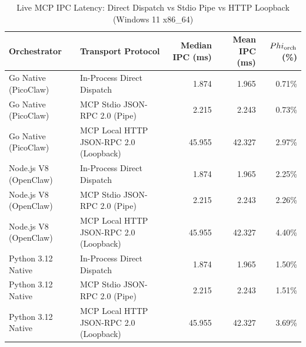 \begin{table}[t]
\centering\small
\caption{Live MCP IPC Latency: Direct Dispatch vs Stdio Pipe vs HTTP Loopback (Windows 11 x86_64)}
\label{tab:Windows_mcp_transport}
\begin{tabular}{llrrr}
\toprule
Orchestrator & Transport Protocol & Median IPC (ms) & Mean IPC (ms) & $\\Phi_{\text{orch}}$ (\%) \\
\midrule
Go Native (PicoClaw) & In-Process Direct Dispatch & 1.874 & 1.965 & 0.71\% \\
Go Native (PicoClaw) & MCP Stdio JSON-RPC 2.0 (Pipe) & 2.215 & 2.243 & 0.73\% \\
Go Native (PicoClaw) & MCP Local HTTP JSON-RPC 2.0 (Loopback) & 45.955 & 42.327 & 2.97\% \\
Node.js V8 (OpenClaw) & In-Process Direct Dispatch & 1.874 & 1.965 & 2.25\% \\
Node.js V8 (OpenClaw) & MCP Stdio JSON-RPC 2.0 (Pipe) & 2.215 & 2.243 & 2.26\% \\
Node.js V8 (OpenClaw) & MCP Local HTTP JSON-RPC 2.0 (Loopback) & 45.955 & 42.327 & 4.40\% \\
Python 3.12 Native & In-Process Direct Dispatch & 1.874 & 1.965 & 1.50\% \\
Python 3.12 Native & MCP Stdio JSON-RPC 2.0 (Pipe) & 2.215 & 2.243 & 1.51\% \\
Python 3.12 Native & MCP Local HTTP JSON-RPC 2.0 (Loopback) & 45.955 & 42.327 & 3.69\% \\
\bottomrule
\end{tabular}
\end{table}
